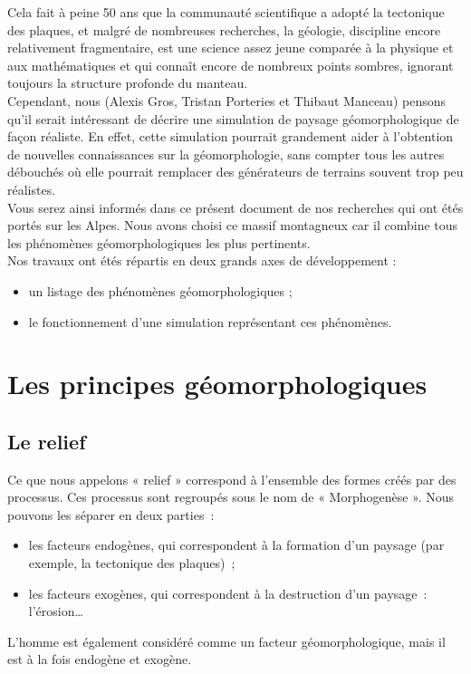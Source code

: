 \documentclass[a4paper,11pt]{article}
\begin{document}
Cela fait à peine 50 ans que la communauté scientifique a adopté la tectonique des plaques, et malgré de nombreuses recherches, la géologie, discipline encore relativement fragmentaire, est une science assez jeune comparée à la physique et aux mathématiques et qui connaît encore de nombreux points sombres, ignorant toujours la structure profonde du manteau. \\
Cependant, nous (Alexis Gros, Tristan Porteries et Thibaut Manceau) pensons qu'il serait intéressant de décrire une simulation de paysage géomorphologique de façon réaliste.
En effet, cette simulation pourrait grandement aider à l'obtention de nouvelles connaissances sur la géomorphologie, sans compter tous les autres débouchés où elle pourrait remplacer des générateurs de terrains souvent trop peu réalistes. \\
Vous serez ainsi informés dans ce présent document de nos recherches qui ont étés portés sur les Alpes. Nous avons choisi ce massif montagneux car il combine tous les phénomènes géomorphologiques les plus pertinents.\\
Nos travaux ont étés répartis en deux grands axes de développement :\\
\begin{itemize}
  \item un listage des phénomènes géomorphologiques ;
  \item le fonctionnement d'une simulation représentant ces phénomènes.
\end{itemize}

\section{Les principes géomorphologiques}

\subsection{Le relief}

Ce que nous appelons « relief » correspond à l'ensemble des formes créés par des processus.
Ces processus sont regroupés sous le nom de « Morphogenèse ».
Nous pouvons les séparer en deux parties~:
\begin{itemize}
  \item les facteurs endogènes, qui correspondent à la formation d'un paysage (par exemple, la tectonique des plaques)~;
  \item les facteurs exogènes, qui correspondent à la destruction d'un paysage~: l'érosion\ldots
\end{itemize}
L'homme est également considéré comme un facteur géomorphologique, mais il est à la fois endogène et exogène.\\
\end{document}
